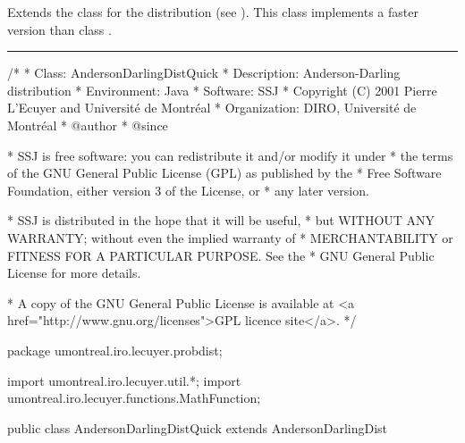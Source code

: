 


Extends the class  for the
\ad{}  distribution (see \cite{tAND52a,tLEW61a,tSTE86b}).
This class implements a faster version than class
. %


\bigskip\hrule

\begin{code}
\begin{hide}
/*
 * Class:        AndersonDarlingDistQuick
 * Description:  Anderson-Darling distribution
 * Environment:  Java
 * Software:     SSJ 
 * Copyright (C) 2001  Pierre L'Ecuyer and Université de Montréal
 * Organization: DIRO, Université de Montréal
 * @author       
 * @since

 * SSJ is free software: you can redistribute it and/or modify it under
 * the terms of the GNU General Public License (GPL) as published by the
 * Free Software Foundation, either version 3 of the License, or
 * any later version.

 * SSJ is distributed in the hope that it will be useful,
 * but WITHOUT ANY WARRANTY; without even the implied warranty of
 * MERCHANTABILITY or FITNESS FOR A PARTICULAR PURPOSE.  See the
 * GNU General Public License for more details.

 * A copy of the GNU General Public License is available at
   <a href="http://www.gnu.org/licenses">GPL licence site</a>.
 */
\end{hide}
package umontreal.iro.lecuyer.probdist;
\begin{hide}
import umontreal.iro.lecuyer.util.*;
import umontreal.iro.lecuyer.functions.MathFunction;
\end{hide} 

public class AndersonDarlingDistQuick extends AndersonDarlingDist\begin{hide} {

   private static class Function implements MathFunction {
      protected int n;
      protected double u;

      public Function (int n, double u) {
         this.n = n;
         this.u = u;
      }

      public double evaluate (double x) {
         return u - cdf(n,x);
      }
   }
\end{hide}
\end{code}

